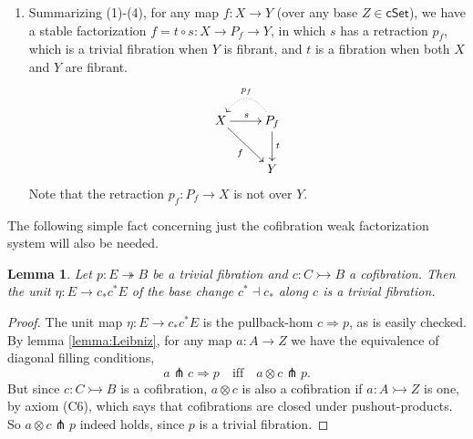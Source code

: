 \documentclass[12pt]{article}
\newcommand{\cSet}{\ensuremath{\mathsf{cSet}}}
\newcommand{\mono}{\ensuremath{\rightarrowtail}}
\newcommand{\ra}{\ensuremath{\rightarrow}}
\renewcommand{\to}{\ensuremath{\rightarrow}}
\newcommand{\onto}{\ensuremath{\twoheadrightarrow}}
\newtheorem{lemma}[theorem]{Lemma}
\theoremstyle{remark}
\theoremstyle{definition}
\begin{document}
\begin{enumerate}
\item Summarizing (1)-(4), for any map $f : X\ra Y$ (over any base $Z\in \cSet$), we have a stable factorization $f = t\circ s : X\ra P_f \ra Y$, in which $s$ has a retraction $p_f$, which is a trivial fibration when $Y$ is fibrant, and $t$ is a fibration when both $X$ and $Y$ are fibrant.  \begin{equation}\label{diag:pathspace factorization3}
\xymatrix{
X \ar[r]^s \ar[rd]_f & \ar@{.>}@/_1.5pc/[l]_{p_f} P_f \ar[d]^t \\
& Y
}
\end{equation}
Note that the retraction $p_f : P_f \ra X$ is not over $Y$.
\end{enumerate}

The following simple fact concerning just the cofibration weak factorization system will also be needed.

\begin{lemma}\label{lemma:etaTF}
Let $p: E \onto B$ be a trivial fibration and $c : C\mono B$ a cofibration.  Then the unit $\eta:E \ra c_*c^*E$ of the base change $c^*\dashv c_*$ along $c$ is a trivial fibration.
\end{lemma}

\begin{proof}
The unit map $\eta:E \ra c_*c^*E$ is the pullback-hom $c\!\Rightarrow\! p$, as is easily checked.
By lemma \ref{lemma:Leibniz}, for any map $a : A \to Z$ we have the equivalence of diagonal filling conditions,
\[
a \pitchfork c\!\Rightarrow\!p  \quad\text{iff}\quad a\!\otimes\!c \pitchfork p.
\]
But since $c : C\mono B$ is a cofibration, $a\otimes c$ is also a cofibration if $a : A \mono Z$ is one, by axiom (C6), which says that cofibrations are closed under pushout-products.  So $a\otimes c \pitchfork p$ indeed holds, since $p$ is a trivial fibration.
\end{proof}
\end{document}
